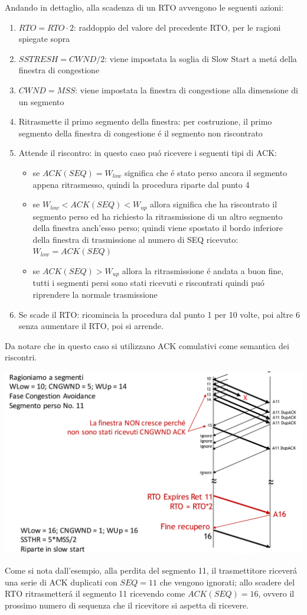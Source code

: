 \documentclass[12pt]{article}
\begin{document}
Andando in dettaglio, alla scadenza di un RTO avvengono le seguenti azioni:
\begin{enumerate}[noitemsep]
	\item $RTO=RTO \cdotp 2$: raddoppio del valore del precedente RTO, per le ragioni spiegate sopra
	\item $SSTRESH=CWND/2$: viene impostata la soglia di Slow Start a met\'a della finestra di congestione
	\item $CWND=MSS$: viene impostata la finestra di congestione alla dimensione di un segmento
	\item Ritrasmette il primo segmento della finestra: per costruzione, il primo segmento 
	      della finestra di congestione \'e il segmento non riscontrato
	\item Attende il riscontro: in questo caso pu\'o ricevere i seguenti tipi di ACK:
	\begin{itemize}[noitemsep]
		\item se $ACK(SEQ) = W_{low}$ significa che \'e stato perso ancora il segmento appena ritrasmesso, quindi la 
			  procedura riparte dal punto 4
		\item se $W_{low} < ACK(SEQ) < W_{up}$ allora significa che ha riscontrato il segmento perso ed ha 
		      richiesto la ritrasmissione di un altro segmento della finestra anch'esso perso; quindi viene spostato 
		      il bordo inferiore della finestra di trasmissione al numero di SEQ ricevuto: $W_{low} = ACK(SEQ)$
	    \item se $ACK(SEQ) > W_{up}$ allora la ritrasmissione \'e andata a buon fine, tutti i segmenti
	          persi sono stati ricevuti e riscontrati quindi pu\'o riprendere la normale trasmissione
	\end{itemize}
	\item Se scade il RTO: ricomincia la procedura dal punto 1 per 10 volte, poi altre 6 senza aumentare il
	      RTO, poi si arrende.
\end{enumerate}
Da notare che in questo caso si utilizzano ACK comulativi come semantica dei riscontri.
\begin{center}
	\includegraphics[scale=0.35]{livello_trasporto-img9.png}
\end{center}
Come si nota dall'esempio, alla perdita del segmento 11, il trasmettitore ricever\'a una serie di ACK duplicati con 
$SEQ=11$ che vengono ignorati; allo scadere del RTO ritrasmetter\'a il segmento 11 ricevendo come $ACK(SEQ)=16$, 
ovvero il prossimo numero di sequenza che il ricevitore si aspetta di ricevere.
\end{document}
